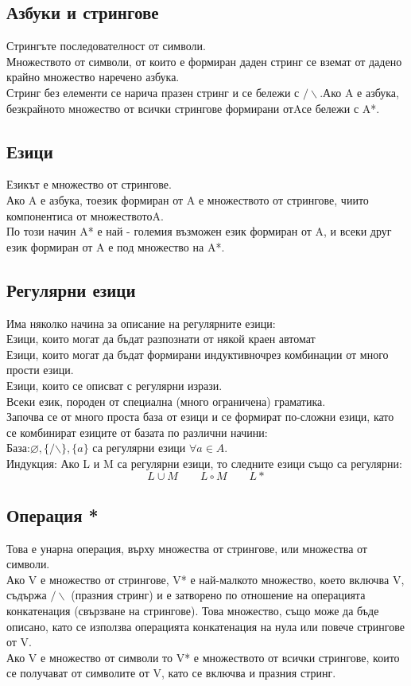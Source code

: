 \documentclass[fleqn, 12pt]{article}
\theoremstyle{definition}
\begin{document}
\subsection{Азбуки и стрингове}
Стрингъте последователност от символи. \\
Множеството от символи, от които е формиран даден стринг се вземат от дадено крайно множество наречено азбука.\\
Стринг без елементи се нарича празен стринг и се бележи с $/\backslash $.Ако A е азбука, безкрайното множество от всички стрингове формирани отAсе бележи с A*.

\subsection{Езици}
Езикът е множество от стрингове.\\
Ако A е азбука, тоезик формиран от A е множеството от стрингове, чиито компонентиса от множествотоA.  \\
По този начин A* е най - големия възможен език формиран от A, и всеки друг език формиран от A е под множество на A*.

\subsection{Регулярни езици}
Има няколко начина за описание на регулярните езици:\\
Езици, които могат да бъдат разпознати от някой краен автомат\\
Езици, които могат да бъдат формирани индуктивночрез комбинации от много прости езици. \\
Езици, които се описват с регулярни изрази.\\
Всеки език, породен от специална (много ограничена) граматика. \\
Започва се от много проста база от езици и се формират по-сложни езици, като се комбинират езиците от базата по различни начини:\\
База:$ \varnothing, \{ /\backslash \}, \{a\}$ са регулярни езици $\forall a \in A$.\\
Индукция: Ако L и M са регулярни езици, то следните езици също са регулярни: 
$$L \cup M \qquad L \circ M \qquad L*$$

\subsection{Операция *}
Това е унарна операция, върху множества от стрингове, или множества от символи. \\
Ако V е множество от стрингове, V* е най-малкото множество, което включва V, съдържа  $/\backslash$ (празния стринг) и е затворено по отношение на операцията конкатенация (свързване на стрингове). Това множество, също може да бъде описано, като се използва операцията конкатенация на нула или повече стрингове от V. \\
Ако V е множество от символи то V* е множеството от всички стрингове, които се получават от символите от V, като се включва и празния стринг. 
\end{document}
